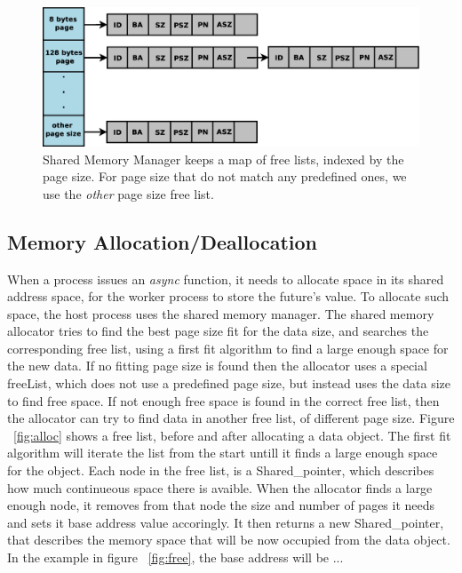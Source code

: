 \begin{figure}[here]
\includegraphics[width=\columnwidth]{figures/free_lists}
\caption{Shared Memory Manager keeps a map of free lists, indexed by the page size.  For page size that do
not match any predefined ones, we use the \emph{other} page size free list.}
\label{fig:freeLists}
\end{figure}

\subsection{Memory Allocation/Deallocation}
When a process issues an \emph{async} function, it needs to allocate space in its shared address space, for the worker process to store the future's value.  To allocate such space, the host process uses the shared memory manager. 
The shared memory allocator tries to find the best page size
fit for the data size, and searches the corresponding free list, using a first fit algorithm to find a large 
enough space for the new data. If no fitting page size is found then the allocator uses a special freeList, 
which does not use a predefined page size, but instead uses the data size to find free space.  If not enough free
space is found in the correct free list, then the allocator can try to find data in another free list, of different
page size.  Figure ~\ref{fig:alloc} shows a free list, before and after allocating a data object.
The first fit algorithm
will iterate the list from the start untill it finds a large enough space for the object.  Each node in the free list,
is a Shared\_pointer, which describes how much continueous space there is avaible.  When the allocator finds a large
enough node, it removes from that node the size and number of pages it needs and sets it base address value accoringly.
It then returns a new Shared\_pointer, that describes the memory space that will be now occupied from the data object.
In the example in figure ~\ref{fig:free}, the base address will be ...

